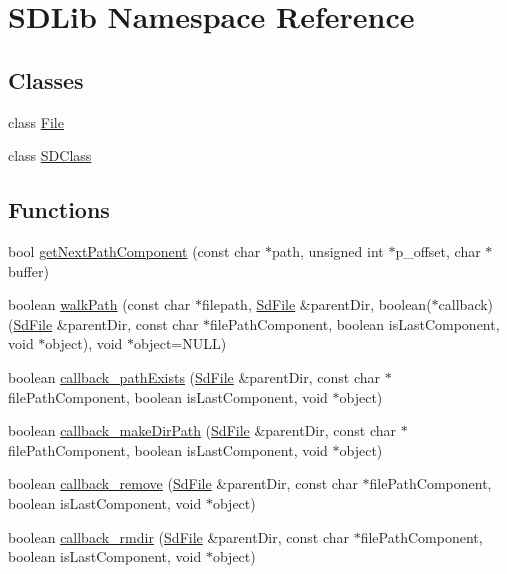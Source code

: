 \hypertarget{namespace_s_d_lib}{}\section{S\+D\+Lib Namespace Reference}
\label{namespace_s_d_lib}
\subsection*{Classes}
\begin{DoxyCompactItemize}
\item 
class \hyperlink{class_s_d_lib_1_1_file}{File}
\item 
class \hyperlink{class_s_d_lib_1_1_s_d_class}{S\+D\+Class}
\end{DoxyCompactItemize}
\subsection*{Functions}
\begin{DoxyCompactItemize}
\item 
bool \hyperlink{namespace_s_d_lib_a104e127390a656ec68fb11b782acb7c1}{get\+Next\+Path\+Component} (const char $\ast$path, unsigned int $\ast$p\+\_\+offset, char $\ast$buffer)
\item 
boolean \hyperlink{namespace_s_d_lib_a319c3e0473e7947f3fb18a9d90b50f08}{walk\+Path} (const char $\ast$filepath, \hyperlink{class_sd_file}{Sd\+File} \&parent\+Dir, boolean($\ast$callback)(\hyperlink{class_sd_file}{Sd\+File} \&parent\+Dir, const char $\ast$file\+Path\+Component, boolean is\+Last\+Component, void $\ast$object), void $\ast$object=N\+U\+LL)
\item 
boolean \hyperlink{namespace_s_d_lib_ae3054a78e49dbc86c7a165cb88c9a3d5}{callback\+\_\+path\+Exists} (\hyperlink{class_sd_file}{Sd\+File} \&parent\+Dir, const char $\ast$file\+Path\+Component, boolean is\+Last\+Component, void $\ast$object)
\item 
boolean \hyperlink{namespace_s_d_lib_a415aeca91de622c5cfa94b4061cd171f}{callback\+\_\+make\+Dir\+Path} (\hyperlink{class_sd_file}{Sd\+File} \&parent\+Dir, const char $\ast$file\+Path\+Component, boolean is\+Last\+Component, void $\ast$object)
\item 
boolean \hyperlink{namespace_s_d_lib_a63cc4943fe20b320fa612b62d8f154bd}{callback\+\_\+remove} (\hyperlink{class_sd_file}{Sd\+File} \&parent\+Dir, const char $\ast$file\+Path\+Component, boolean is\+Last\+Component, void $\ast$object)
\item 
boolean \hyperlink{namespace_s_d_lib_ac81c649845a87cad2dcfd20f67f7c5aa}{callback\+\_\+rmdir} (\hyperlink{class_sd_file}{Sd\+File} \&parent\+Dir, const char $\ast$file\+Path\+Component, boolean is\+Last\+Component, void $\ast$object)
\end{DoxyCompactItemize}

